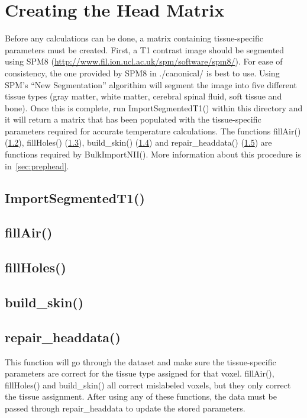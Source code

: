 \section{Creating the Head Matrix}
\label{apdx:headmatrix}
Before any calculations can be done, a matrix containing tissue-specific parameters must be created.  First, a T1 contrast image should be segmented using SPM8 (\url{http://www.fil.ion.ucl.ac.uk/spm/software/spm8/}).  For ease of consistency, the one provided by SPM8 in ./canonical/ is best to use.  Using SPM's ``New Segmentation'' algorithim will segment the image into five different tissue types (gray matter, white matter, cerebral spinal fluid, soft tissue and bone).  Once this is complete, run ImportSegmentedT1() within this directory and it will return a matrix that has been populated with the tissue-specific parameters required for accurate temperature calculations. The functions fillAir() (\ref{code:fillair}), fillHoles() (\ref{code:fillHoles}), build\_skin() (\ref{code:buildskin}) and repair\_headdata() (\ref{code:repairheaddata}) are functions required by BulkImportNII().  More information about this procedure is in~\cref{sec:prephead}.
\subsection{ImportSegmentedT1()}

\subsection{fillAir()}
\label{code:fillair}

\subsection{fillHoles()}
\label{code:fillHoles}

\subsection{build\_skin()}
\label{code:buildskin}

\subsection{repair\_headdata()}
\label{code:repairheaddata}
This function will go through the dataset and make sure the tissue-specific parameters are correct for the tissue type assigned for that voxel.  fillAir(), fillHoles() and build\_skin() all correct mislabeled voxels, but they only correct the tissue assignment.  After using any of these functions, the data must be passed through repair\_headdata to update the stored parameters.

\clearpage

